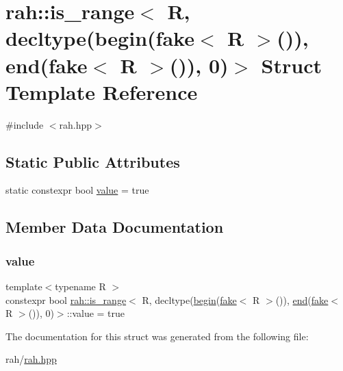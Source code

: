 \hypertarget{structrah_1_1is__range_3_01_r_00_01decltype_07begin_07fake_3_01_r_01_4_07_08_08_00_01end_07fake_cf1a9a1e2579209cb82001bc9eda23c1}{}\section{rah\+::is\+\_\+range$<$ R, decltype(begin(fake$<$ R $>$()), end(fake$<$ R $>$()), 0)$>$ Struct Template Reference}
\label{structrah_1_1is__range_3_01_r_00_01decltype_07begin_07fake_3_01_r_01_4_07_08_08_00_01end_07fake_cf1a9a1e2579209cb82001bc9eda23c1}


{\ttfamily \#include $<$rah.\+hpp$>$}

\subsection*{Static Public Attributes}
\begin{DoxyCompactItemize}
\item 
static constexpr bool \mbox{\hyperlink{structrah_1_1is__range_3_01_r_00_01decltype_07begin_07fake_3_01_r_01_4_07_08_08_00_01end_07fake_cf1a9a1e2579209cb82001bc9eda23c1_a2db25b392468218215a33d83c40913bf}{value}} = true
\end{DoxyCompactItemize}


\subsection{Member Data Documentation}
\mbox{\label{structrah_1_1is__range_3_01_r_00_01decltype_07begin_07fake_3_01_r_01_4_07_08_08_00_01end_07fake_cf1a9a1e2579209cb82001bc9eda23c1_a2db25b392468218215a33d83c40913bf}} 
\subsubsection{\texorpdfstring{value}{value}}
{\footnotesize\ttfamily template$<$typename R $>$ \\
constexpr bool \mbox{\hyperlink{structrah_1_1is__range}{rah\+::is\+\_\+range}}$<$ R, decltype(\mbox{\hyperlink{namespacerah_ad248c9fcef327fc3e31ef8bf6ea70f6f}{begin}}(\mbox{\hyperlink{namespacerah_a11785bbdf970efa1bc57fc14993b77bf}{fake}}$<$ R $>$()), \mbox{\hyperlink{namespacerah_ac309d041d5f4110ecf2d1b44f4282275}{end}}(\mbox{\hyperlink{namespacerah_a11785bbdf970efa1bc57fc14993b77bf}{fake}}$<$ R $>$()), 0)$>$\+::value = true\hspace{0.3cm}{\ttfamily [static]}}



The documentation for this struct was generated from the following file\+:\begin{DoxyCompactItemize}
\item 
rah/\mbox{\hyperlink{rah_8hpp}{rah.\+hpp}}\end{DoxyCompactItemize}
